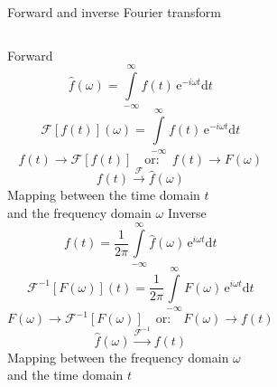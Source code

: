 \documentclass[10pt,aspectratio=169,notes]{beamer} %
\newcommand{\ud}{\mathrm{d}}
\newcommand{\myexp}{\mathrm{e}}
\begin{document}
\begin{frame}[label=frame4]{Forward and inverse Fourier transform}
\begin{columns}[T]
	\centering
	Forward\\
	\begin{equation*}
	\hat{f}(\omega) = \int \limits_{-\infty}^{\infty} f(t)\, \myexp^{-i \omega t} \ud t 
	\end{equation*}
	\begin{equation*}
	\mathcal{F} \left[f(t) \right](\omega)=\int \limits_{-\infty}^{\infty} f(t)\, \myexp^{-i \omega t} \ud t 
	\end{equation*}
	\begin{equation*}
	f(t) \rightarrow \mathcal{F} \left[f(t) \right] \quad  \textrm{or:} \quad f(t)  \rightarrow F(\omega)
	\end{equation*}
	\begin{equation*}
	f(t) \xrightarrow{\mathcal{F}} \hat{f}(\omega)
	\end{equation*}
	Mapping between the time domain \(t\) \\and the frequency domain \(\omega\)
	\centering
	Inverse\\
	\begin{equation*}
	f(t) = \frac{1}{2 \pi} \int \limits_{-\infty}^{\infty} \hat{f}(\omega)\, \myexp^{i \omega t} \ud t 
	\end{equation*}
    \begin{equation*}	
    \mathcal{F}^{-1} \left[F(\omega) \right](t)=\frac{1}{2 \pi}  \int \limits_{-\infty}^{\infty} F(\omega)\, \myexp^{i \omega t} \ud t 
	\end{equation*}
	\begin{equation*}
	F(\omega) \rightarrow \mathcal{F}^{-1} \left[F(\omega) \right] \quad   \textrm{or:} \quad 	F(\omega) \rightarrow f(t)
	\end{equation*}
	\begin{equation*}
	\hat{f}(\omega) \xrightarrow{\mathcal{F}^{-1}}  f(t)
	\end{equation*}
	Mapping between the frequency domain  \(\omega\) \\and the time domain \(t\)
	
\end{columns}
\end{frame}
\end{document}
